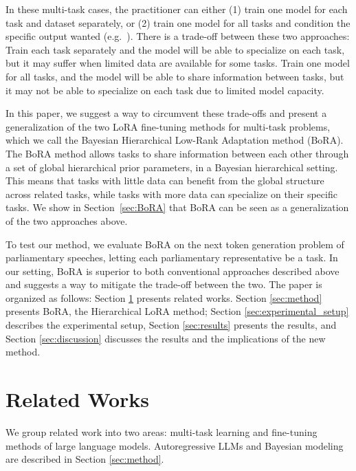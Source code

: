 \documentclass[fullpaper]{nldl}
\begin{document}
In these multi-task cases, the practitioner can either (1) train one model for each task and dataset separately, or (2) train one model for all tasks and condition the specific output wanted (e.g.~\cite{Raffel2019}).
There is a trade-off between these two approaches: Train each task separately and the model will be able to specialize on each task, but it may suffer when limited data are available for some tasks. 
Train one model for all tasks, and the model will be able to share information between tasks, but it may not be able to specialize on each task due to limited model capacity.

In this paper, we suggest a way to circumvent these trade-offs and present a generalization of the two LoRA fine-tuning methods for multi-task problems, which we call the Bayesian Hierarchical Low-Rank Adaptation method (BoRA).
The BoRA method allows tasks to share information between each other through a set of global hierarchical prior parameters, in a Bayesian hierarchical setting. 
This means that tasks with little data can benefit from the global structure across related tasks, while tasks with more data can specialize on their specific tasks.
We show in Section~\ref{sec:BoRA} that BoRA can be seen as a generalization of the two approaches above.

To test our method, we evaluate BoRA on the next token generation problem of parliamentary speeches, letting each parliamentary representative be a task. 
In our setting, BoRA is superior to both conventional approaches described above and suggests a way to mitigate the trade-off between the two.
The paper is organized as follows: Section \ref{sec:related_works} presents related works. 
Section \ref{sec:method} presents BoRA, the Hierarchical LoRA method; Section \ref{sec:experimental_setup} describes the experimental setup, Section \ref{sec:results} presents the results, and Section \ref{sec:discussion} discusses the results and the implications of the new method.



\section{Related Works} \label{sec:related_works}
We group related work into two areas: multi-task learning and fine-tuning methods of large language models. 
Autoregressive LLMs and Bayesian modeling are described in Section \ref{sec:method}.
\end{document}
